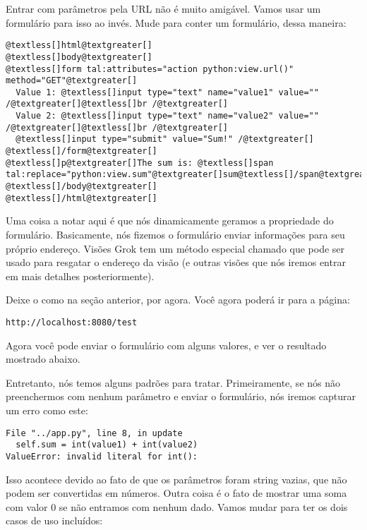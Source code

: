 \documentclass[a4paper,12pt,portuguese]{manual}
\begin{document}
Entrar com parâmetros pela URL não é muito amigável. Vamos usar um
formulário para isso ao invés. Mude  para conter um
formulário, dessa maneira:

\begin{Verbatim}[commandchars=@\[\]]
@textless[]html@textgreater[]
@textless[]body@textgreater[]
@textless[]form tal:attributes="action python:view.url()" method="GET"@textgreater[]
  Value 1: @textless[]input type="text" name="value1" value="" /@textgreater[]@textless[]br /@textgreater[]
  Value 2: @textless[]input type="text" name="value2" value="" /@textgreater[]@textless[]br /@textgreater[]
  @textless[]input type="submit" value="Sum!" /@textgreater[]
@textless[]/form@textgreater[]
@textless[]p@textgreater[]The sum is: @textless[]span tal:replace="python:view.sum"@textgreater[]sum@textless[]/span@textgreater[]@textless[]/p@textgreater[]
@textless[]/body@textgreater[]
@textless[]/html@textgreater[]
\end{Verbatim}

Uma coisa a notar aqui é que nós dinamicamente geramos a propriedade
 do formulário. Basicamente, nós fizemos o formulário enviar informações
para seu próprio endereço. Visões Grok tem um método especial chamado
 que pode ser usado para resgatar o endereço da visão
(e outras visões que nós iremos entrar em mais detalhes
posteriormente).

Deixe o  como na seção anterior, por agora. Você agora
poderá ir para a página:

\begin{Verbatim}[commandchars=@\[\]]
http://localhost:8080/test
\end{Verbatim}

Agora você pode enviar o formulário com alguns valores, e ver o
resultado mostrado abaixo.

Entretanto, nós temos alguns padrões para tratar. Primeiramente, se
nós não preenchermos com nenhum parâmetro e enviar o formulário, nós
iremos capturar um erro como este:

\begin{Verbatim}[commandchars=@\[\]]
File "../app.py", line 8, in update
  self.sum = int(value1) + int(value2)
ValueError: invalid literal for int():
\end{Verbatim}

Isso acontece devido ao fato de que os parâmetros foram string vazias,
que não podem ser convertidas em números. Outra coisa é o fato de mostrar
uma soma com valor 0 se não entramos com nenhum dado. Vamos mudar 
para ter os dois casos de uso incluídos:
\end{document}
